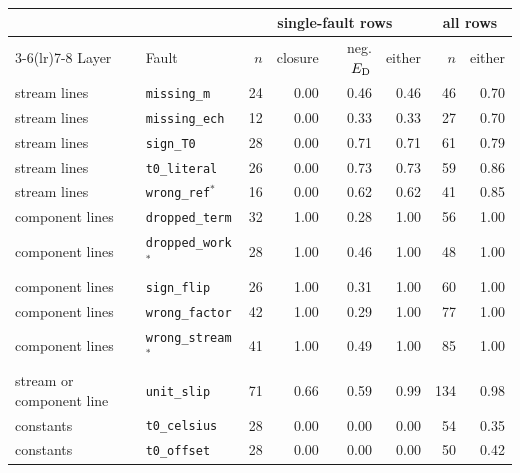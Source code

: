 \begingroup\small\setlength{\tabcolsep}{4pt}
\begin{tabular}{@{}llrrrrrr@{}}
\toprule
 & & \multicolumn{4}{c}{single-fault rows} & \multicolumn{2}{c}{all rows} \\
\cmidrule(lr){3-6}\cmidrule(lr){7-8}
Layer & Fault & $n$ & closure & neg. $E_{\mathrm{D}}$ & either & $n$ & either \\
\midrule
stream lines & \texttt{missing\_m} & 24 & 0.00 & 0.46 & 0.46 & 46 & 0.70 \\
stream lines & \texttt{missing\_ech} & 12 & 0.00 & 0.33 & 0.33 & 27 & 0.70 \\
stream lines & \texttt{sign\_T0} & 28 & 0.00 & 0.71 & 0.71 & 61 & 0.79 \\
stream lines & \texttt{t0\_literal} & 26 & 0.00 & 0.73 & 0.73 & 59 & 0.86 \\
stream lines & \texttt{wrong\_ref}$^*$ & 16 & 0.00 & 0.62 & 0.62 & 41 & 0.85 \\
component lines & \texttt{dropped\_term} & 32 & 1.00 & 0.28 & 1.00 & 56 & 1.00 \\
component lines & \texttt{dropped\_work}$^*$ & 28 & 1.00 & 0.46 & 1.00 & 48 & 1.00 \\
component lines & \texttt{sign\_flip} & 26 & 1.00 & 0.31 & 1.00 & 60 & 1.00 \\
component lines & \texttt{wrong\_factor} & 42 & 1.00 & 0.29 & 1.00 & 77 & 1.00 \\
component lines & \texttt{wrong\_stream}$^*$ & 41 & 1.00 & 0.49 & 1.00 & 85 & 1.00 \\
stream or component line & \texttt{unit\_slip} & 71 & 0.66 & 0.59 & 0.99 & 134 & 0.98 \\
constants & \texttt{t0\_celsius} & 28 & 0.00 & 0.00 & 0.00 & 54 & 0.35 \\
constants & \texttt{t0\_offset} & 28 & 0.00 & 0.00 & 0.00 & 50 & 0.42 \\
\bottomrule
\end{tabular}\endgroup

